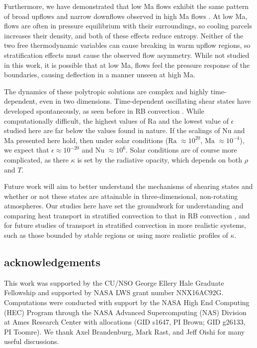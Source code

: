 \documentclass[aps, prl, twocolumn, nofootinbib, groupedaddress, amsfonts, amssymb, amsmath]{revtex4-1}
\begin{document}
Furthermore, we have demonstrated that low Ma flows exhibit the same pattern of broad upflows and narrow downflows
observed in high Ma flows \cite{hurlburt&all1984}.  At low Ma, flows are often in pressure equilibrium
with their surroundings, so cooling parcels increases their density, and both of these effects reduce
entropy.  Neither of the two free thermodynamic variables can cause breaking in warm upflow regions, 
so stratification effects must cause the observed flow asymmetry.
While not studied in this work, it is possible that at low Ma, flows feel the pressure response of the
boundaries, causing deflection in a manner unseen at high Ma.

The dynamics of these polytropic solutions are complex and highly time-dependent, even in two dimensions.
Time-dependent oscillating shear states have developed spontaneously, as seen before in RB convection
\cite{goluskin&all2014}.  While computationally difficult, the highest values of Ra and the lowest value
of $\epsilon$ studied here are far below the values found in nature.  If the scalings of Nu and Ma
presented here hold, then under solar conditions ($\text{Ra }\approx 10^{20}$, $\text{Ma }\approx 10^{-4}$), we expect that $\epsilon \approx 10^{-20}$ and
$\text{Nu }\approx 10^{6}$.  
Solar conditions are of course more complicated, as there $\kappa$ is
set by the radiative opacity, which depends on both $\rho$ and $T$.

Future work will aim to better understand the mechanisms of shearing states and
whether or not these states are attainable in three-dimensional, non-rotating atmospheres.  Our studies
here have set the groundwork for understanding and comparing heat transport in stratified convection
to that in RB convection \cite{johnston&doering2009}, and for future studies of transport in stratified
convection in more realistic systems, such as those bounded by stable regions \cite{hurlburt&all2009} or 
using more realistic profiles of $\kappa$.



\subsection{acknowledgements}
This work was supported by the CU/NSO George Ellery Hale Graduate Fellowship
and supported by NASA LWS grant number NNX16AC92G.  Computations were conducted 
with support by the NASA High End Computing (HEC) Program through the NASA 
Advanced Supercomputing (NAS) Division at Ames Research Center
with allocations (GID s1647, PI Brown; GID g26133, PI Toomre).
We thank Axel Brandenburg, Mark Rast, and Jeff Oishi for many useful discussions.


\end{document}
